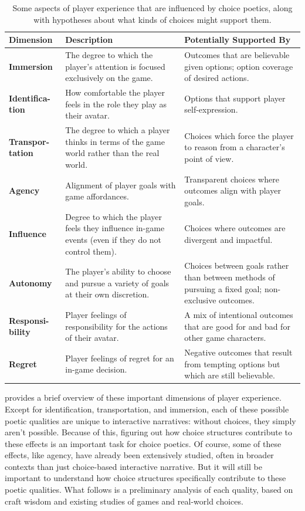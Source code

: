 \begin{table}[!p]
\begingroup
\renewcommand*{\arraystretch}{1.5}
\begin{tabular}{>{\raggedright}p{5.6em}>{\raggedright}p{13.9em}>{\raggedright}p{13.5em}}
\toprule
\textbf{Dimension} & \textbf{Description} & \textbf{Potentially Supported By} \tabularnewline
\midrule
\textbf{Immersion} & The degree to which the player's attention is focused exclusively on the game. & Outcomes that are believable given options; option coverage of desired actions. \tabularnewline
\textbf{Identifica-tion} & How comfortable the player feels in the role they play as their avatar. & Options that support player self-expression. \tabularnewline
\textbf{Transpor-tation} & The degree to which a player thinks in terms of the game world rather than the real world. & Choices which force the player to reason from a character's point of view. \tabularnewline
\textbf{Agency} & Alignment of player goals with game affordances. & Transparent choices where outcomes align with player goals.\tabularnewline
\textbf{Influence} & Degree to which the player feels they influence in-game events (even if they do not control them). & Choices where outcomes are divergent and impactful. \tabularnewline
\textbf{Autonomy} & The player's ability to choose and pursue a variety of goals at their own discretion. & Choices between goals rather than between methods of pursuing a fixed goal; non-exclusive outcomes. \tabularnewline
\textbf{Responsi-bility} & Player feelings of responsibility for the actions of their avatar. & A mix of intentional outcomes that are good for and bad for other game characters. \tabularnewline
\textbf{Regret} & Player feelings of regret for an in-game decision. & Negative outcomes that result from tempting options but which are still believable. \tabularnewline
\bottomrule
\end{tabular}
\endgroup
\caption[Dimensions of player experience]{Some aspects of player experience that are influenced by choice poetics, along with hypotheses about what kinds of choices might support them.}
\label{tab:dimensions-of-experience}
\end{table}

 provides a brief overview of these important dimensions of player experience.
%
Except for identification, transportation, and immersion, each of these possible poetic qualities are unique to interactive narratives: without choices, they simply aren't possible.
%
Because of this, figuring out how choice structures contribute to these effects 
is an important task for choice poetics.
%
Of course, some of these effects, like agency, have already been extensively studied, often in broader contexts than just choice-based interactive narrative.
%
But it will still be important to understand how choice structures specifically contribute to these poetic qualities.
%
What follows is a preliminary analysis of each quality, based on craft wisdom and existing studies of games and real-world choices.

